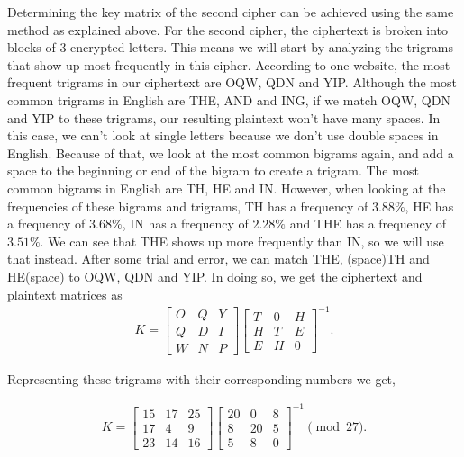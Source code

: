\documentclass{article}
\begin{document}
\par Determining the key matrix of the second cipher can be achieved using the same method as explained above. For the second cipher, the ciphertext is broken into blocks of $3$ encrypted letters. This means we will start by analyzing the trigrams that show up most frequently in this cipher. According to one website, the most frequent trigrams in our ciphertext are OQW, QDN and YIP. \cite{edu} Although the most common trigrams in English are THE, AND and ING, if we match OQW, QDN and YIP to these trigrams, our resulting plaintext won't have many spaces. In this case, we can't look at single letters because we don't use double spaces in English. Because of that, we look at the most common bigrams again, and add a space to the beginning or end of the bigram to create a trigram. The most common bigrams in English are TH, HE and IN. However, when looking at the frequencies of these bigrams and trigrams, TH has a frequency of $3.88\%$, HE has a frequency of $3.68\%$, IN has a frequency of $2.28\%$ and THE has a frequency of $3.51\%$. We can see that THE shows up more frequently than IN, so we will use that instead. After some trial and error, we can match THE, (space)TH and HE(space) to OQW, QDN and YIP. In doing so, we get the ciphertext and plaintext matrices as
\begin{align*}
    K =
    \begin{bmatrix}
        O & Q & Y\\
        Q & D & I\\
        W & N & P
    \end{bmatrix}
    \begin{bmatrix}
        T & 0 & H\\
        H & T & E\\
        E & H & 0
    \end{bmatrix}
    ^{-1}.
\end{align*}

Representing these trigrams with their corresponding numbers we get,

\begin{align*}
    K = 
    \begin{bmatrix}
        15 & 17 & 25\\
        17 & 4 & 9\\
        23 & 14 & 16
    \end{bmatrix}
    \begin{bmatrix}
        20 & 0 & 8\\
        8 & 20 & 5\\
        5 & 8 & 0
    \end{bmatrix}
    ^{-1} \pmod {27}.
\end{align*}
\end{document}
